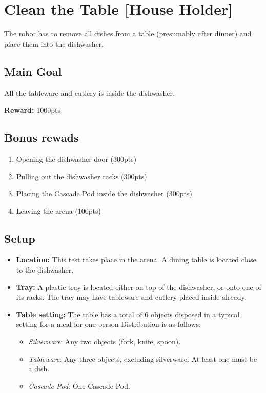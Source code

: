 \section{Clean the Table [House Holder]}
The robot has to remove all dishes from a table (presumably after dinner) and place them into the dishwasher.


\subsection{Main Goal}
All the tableware and cutlery is inside the dishwasher.

\noindent\textbf{Reward:} 1000pts

\subsection{Bonus rewads}
\begin{enumerate}[nosep]
	\item Opening the dishwasher door (300pts)
	\item Pulling out the dishwasher racks (300pts)
	\item Placing the Cascade Pod inside the dishwasher (300pts)
	\item Leaving the arena (100pts)
\end{enumerate}

\subsection{Setup}
\begin{itemize}[nosep]
	\item \textbf{Location:} This test takes place in the arena. A dining table is located close to the dishwasher.
	\item \textbf{Tray:} A plastic tray is located either on top of the dishwasher, or onto one of its racks. The tray may have tableware and cutlery placed inside already.
	\item \textbf{Table setting:} The table has a total of 6 objects disposed in a typical setting for a meal for one person
	Distribution is as follows:
	\begin{itemize}[nosep]
		\item\textit{Silverware}: Any two objects (fork, knife, spoon).
		\item\textit{Tableware}: Any three objects, excluding silverware. At least one must be a dish.
		\item\textit{Cascade Pod}: One Cascade Pod.
	\end{itemize}
\end{itemize}


